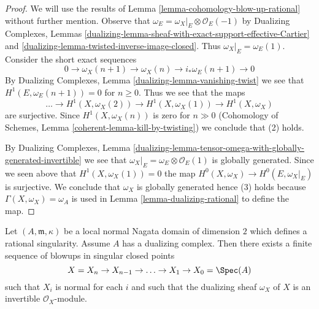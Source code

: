 \begin{proof}
We will use the results of Lemma \ref{lemma-cohomology-blow-up-rational}
without further mention. Observe that
$\omega_E = \omega_X|_E \otimes \mathcal{O}_E(-1)$
by Dualizing Complexes, Lemmas
\ref{dualizing-lemma-sheaf-with-exact-support-effective-Cartier} and
\ref{dualizing-lemma-twisted-inverse-image-closed}. Thus
$\omega_X|_E = \omega_E(1)$. Consider the short exact sequences
$$
0 \to \omega_X(n + 1) \to \omega_X(n) \to i_*\omega_E(n + 1) \to 0
$$
By Dualizing Complexes, Lemma \ref{dualizing-lemma-vanishing-twist}
we see that $H^1(E, \omega_E(n + 1)) = 0$ for $n \geq 0$.
Thus we see that the maps
$$
\ldots \to H^1(X, \omega_X(2)) \to H^1(X, \omega_X(1)) \to H^1(X, \omega_X)
$$
are surjective. Since $H^1(X, \omega_X(n))$ is zero for $n \gg 0$
(Cohomology of Schemes, Lemma \ref{coherent-lemma-kill-by-twisting})
we conclude that (2) holds.

\medskip\noindent
By Dualizing Complexes, Lemma
\ref{dualizing-lemma-tensor-omega-with-globally-generated-invertible}
we see that $\omega_X|_E = \omega_E \otimes \mathcal{O}_E(1)$
is globally generated. Since we seen above that
$H^1(X, \omega_X(1)) = 0$ the map $H^0(X, \omega_X) \to H^0(E, \omega_X|_E)$
is surjective. We conclude that $\omega_X$ is globally generated
hence (3) holds because $\Gamma(X, \omega_X) = \omega_A$ is used
in Lemma \ref{lemma-dualizing-rational} to define the map.
\end{proof}

\begin{lemma}
\label{lemma-rational-to-gorenstein}
Let $(A, \mathfrak m, \kappa)$ be a local normal Nagata domain of
dimension $2$ which defines a rational singularity. Assume $A$ has
a dualizing complex. Then there exists a finite sequence of blowups in
singular closed points
$$
X = X_n \to X_{n - 1} \to \ldots \to X_1 \to X_0 = \Spec(A)
$$
such that $X_i$ is normal for each $i$ and such that
the dualizing sheaf $\omega_X$ of $X$ is an invertible
$\mathcal{O}_X$-module.
\end{lemma}

